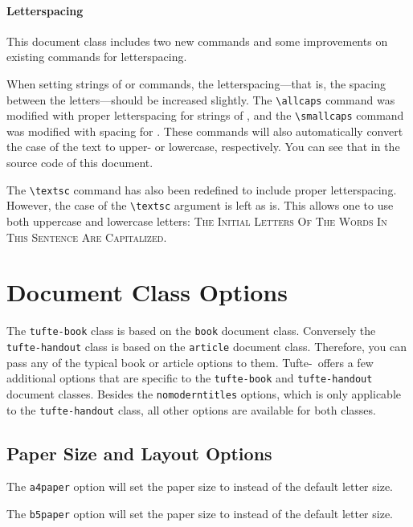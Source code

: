 \documentclass[a4paper]{tufte-handout}
\newcommand{\TL}{Tufte-\hologo{LaTeX}\xspace}
\newcommand{\hlorange}[1]{\textcolor{tufte-orange}{#1}}
\newcommand{\doccmd}[1]{\hlorange{\texttt{\textbackslash#1}}}
\newcommand{\doccls}[1]{\texttt{#1}}
\newcommand{\docclsopt}[1]{\hlorange{\texttt{#1}}}
\begin{document}
\paragraph{Letterspacing}\label{par:letterspacing}
This document class includes two new commands and some improvements on existing commands for letterspacing.

When setting strings of  or  commands, the letter\-spacing---that is, the spacing between the letters---should be increased slightly.\cite{Bringhurst2005}
The \doccmd{allcaps} command was modified with proper letterspacing for strings of , and the \doccmd{smallcaps} command was modified with spacing for .
These commands will also automatically convert the case of the text to upper- or lowercase, respectively.
You can see that in the source code of this document.

The \doccmd{textsc} command has also been redefined to include proper letterspacing.
However, the case of the \doccmd{textsc} argument is left as is.
This allows one to use both uppercase and lowercase letters:
\textsc{The Initial Letters Of The Words In This Sentence Are Capitalized.}


\pagebreak
\section{Document Class Options}\label{sec:document-class-options}
The \doccls{tufte-book} class is based on the  \doccls{book} document class.
Conversely the \doccls{tufte-handout} class is based on the \doccls{article} document class.
Therefore, you can pass any of the typical book or article options to them.
\TL\ offers a few additional options that are specific to the \doccls{tufte-book} and \doccls{tufte-handout} document classes.
Besides the \docclsopt{nomoderntitles} options, which is only applicable to the \doccls{tufte-handout} class, all other options are available for both classes.

\subsection{Paper Size and Layout Options}\label{ssec:paper-size-layout-options}
The \docclsopt{a4paper} option will set the paper size to  instead of the default  letter size.

The \docclsopt{b5paper} option will set the paper size to  instead of the default  letter size.
\end{document}
